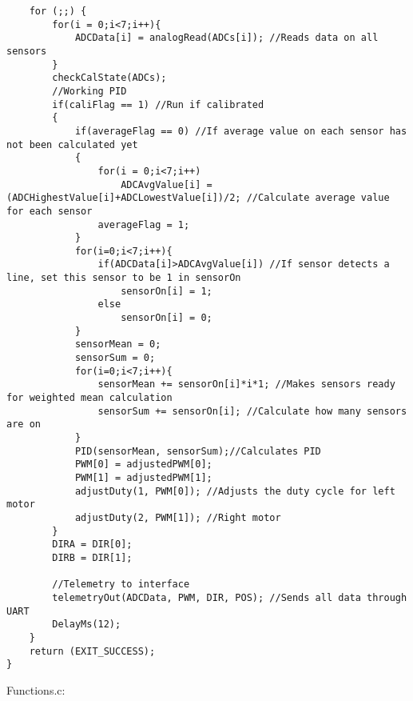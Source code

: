 \begin{lstlisting}
    for (;;) {
        for(i = 0;i<7;i++){
            ADCData[i] = analogRead(ADCs[i]); //Reads data on all sensors
        }
        checkCalState(ADCs);
        //Working PID
        if(caliFlag == 1) //Run if calibrated
        {
            if(averageFlag == 0) //If average value on each sensor has not been calculated yet
            {
                for(i = 0;i<7;i++)
                    ADCAvgValue[i] = (ADCHighestValue[i]+ADCLowestValue[i])/2; //Calculate average value for each sensor
                averageFlag = 1;
            }
            for(i=0;i<7;i++){
                if(ADCData[i]>ADCAvgValue[i]) //If sensor detects a line, set this sensor to be 1 in sensorOn
                    sensorOn[i] = 1;
                else
                    sensorOn[i] = 0;
            }
            sensorMean = 0;
            sensorSum = 0;
            for(i=0;i<7;i++){
                sensorMean += sensorOn[i]*i*1; //Makes sensors ready for weighted mean calculation
                sensorSum += sensorOn[i]; //Calculate how many sensors are on
            }
            PID(sensorMean, sensorSum);//Calculates PID
            PWM[0] = adjustedPWM[0]; 
            PWM[1] = adjustedPWM[1];
            adjustDuty(1, PWM[0]); //Adjusts the duty cycle for left motor
            adjustDuty(2, PWM[1]); //Right motor
        }
        DIRA = DIR[0];
        DIRB = DIR[1];
        
        //Telemetry to interface
        telemetryOut(ADCData, PWM, DIR, POS); //Sends all data through UART
        DelayMs(12);
    }
    return (EXIT_SUCCESS);
}
\end{lstlisting}
\newpage
Functions.c:
